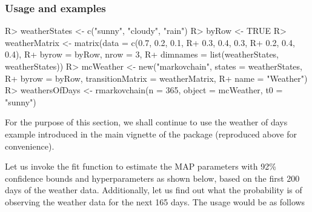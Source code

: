 \documentclass[
  nojss]{jss}
\begin{document}
\hypertarget{usage-and-examples}{%
\subsubsection{Usage and examples}\label{usage-and-examples}}

\begin{CodeChunk}

\begin{CodeInput}
R> weatherStates <- c("sunny", "cloudy", "rain")
R> byRow <- TRUE
R> weatherMatrix <- matrix(data = c(0.7, 0.2, 0.1, 
R+                                  0.3, 0.4, 0.3, 
R+                                  0.2, 0.4, 0.4), 
R+                         byrow = byRow, nrow = 3, 
R+                         dimnames = list(weatherStates, weatherStates))
R> mcWeather <- new("markovchain", states = weatherStates, 
R+                  byrow = byRow, transitionMatrix = weatherMatrix, 
R+                  name = "Weather")      
R> weathersOfDays <- rmarkovchain(n = 365, object = mcWeather, t0 = "sunny")
\end{CodeInput}
\end{CodeChunk}

For the purpose of this section, we shall continue to use the weather of days example introduced in the main vignette of the package (reproduced above for convenience).

Let us invoke the fit function to estimate the MAP parameters with 92\% confidence bounds and hyperparameters as shown below, based on the first 200 days of the weather data. Additionally, let us find out what the probability is of observing the weather data for the next 165 days. The usage would be as follows
\end{document}
